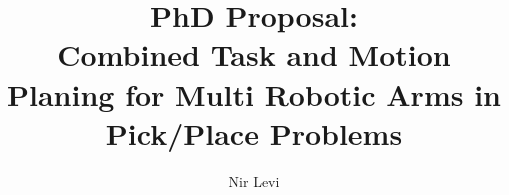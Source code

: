 \documentclass[english]{article}
\theoremstyle{definition}
\begin{document}
\title{PhD Proposal: \\ Combined Task and Motion Planing for Multi Robotic Arms in Pick/Place Problems}

\author{Nir Levi}

\maketitle

\newpage
\tableofcontents
\listoffigures


\newpage


\newpage


\newpage


\newpage


\newpage


\newpage

\end{document}
